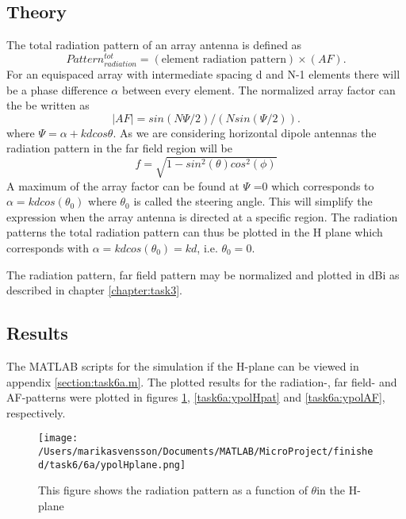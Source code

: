\subsection{Theory}
The total radiation pattern of an array antenna is defined as  
\begin{equation}
Pattern_{radiation}^{tot} = (\text{element radiation pattern})\times(AF).
\end{equation}
 For an equispaced array with intermediate spacing d and N-1 elements there will be a phase difference $\alpha$ between every element. The normalized array factor can the be written as 
\begin{equation}
|AF| = sin(N\Psi/2)/( N sin(\Psi/2) ).
\end{equation}
where $\Psi = \alpha + kdcos\theta$.  As we are considering horizontal dipole antennas the radiation pattern in the far field region will be 
\begin{equation}
f = \sqrt{1-sin^2(\theta)cos^2(\phi)}
\end{equation}
A maximum of the array factor can be found at $\Psi$ =0 which corresponds to $\alpha = kdcos(\theta_0)$ where $\theta_0$ is called the steering angle. This will simplify the expression when the array antenna is directed at a specific region. The radiation patterns the total radiation pattern can thus be plotted in the H plane  which corresponds with $\alpha = kdcos(\theta_0) =kd$, i.e. $\theta_0 =0$\cite{AntennasFundamentals}. \cite{kildal2000foundations}

The radiation pattern, far field pattern may be normalized and plotted in dBi as described in chapter \ref{chapter:task3}.

\subsection{Results}
The MATLAB scripts for the simulation if the H-plane can be viewed in appendix \ref{section:task6a.m}. The plotted results for  the radiation-, far field- and AF-patterns were plotted in figures \ref{task6a:ypol}, \ref{task6a:ypolHpat} and \ref{task6a:ypolAF}, respectively. 

\begin{figure}[h]
\centering
\texttt{[image: /Users/marikasvensson/Documents/MATLAB/MicroProject/finished/task6/6a/ypolHplane.png]}
\caption{This figure shows the radiation pattern as a function of $\theta$in the H-plane}
\label{task6a:ypol}
\end{figure}


